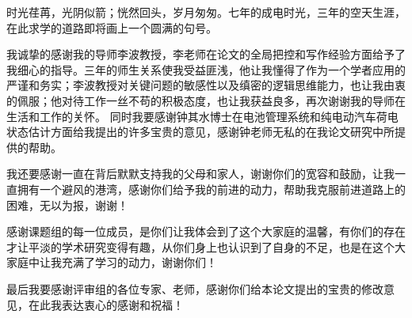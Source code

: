 
时光荏苒，光阴似箭；恍然回头，岁月匆匆。七年的成电时光，三年的空天生涯，在此求学的道路即将画上一个圆满的句号。

我诚挚的感谢我的导师李波教授，李老师在论文的全局把控和写作经验方面给予了我细心的指导。三年的师生关系使我受益匪浅，他让我懂得了作为一个学者应用的严谨和务实；李波教授对关键问题的敏感性以及缜密的逻辑思维能力，也让我由衷的佩服；他对待工作一丝不苟的积极态度，也让我获益良多，再次谢谢我的导师在生活和工作的关怀。
同时我要感谢钟其水博士在电池管理系统和纯电动汽车荷电状态估计方面给我提出的许多宝贵的意见，感谢钟老师无私的在我论文研究中所提供的帮助。

我还要感谢一直在背后默默支持我的父母和家人，谢谢你们的宽容和鼓励，让我一直拥有一个避风的港湾，感谢你们给予我的前进的动力，帮助我克服前进道路上的困难，无以为报，谢谢！

感谢课题组的每一位成员，是你们让我体会到了这个大家庭的温馨，有你们的存在才让平淡的学术研究变得有趣，从你们身上也认识到了自身的不足，也是在这个大家庭中让我充满了学习的动力，谢谢你们！ 

最后我要感谢评审组的各位专家、老师，感谢你们给本论文提出的宝贵的修改意见，在此我表达衷心的感谢和祝福！

